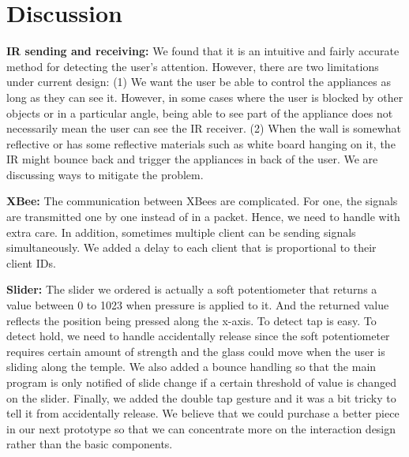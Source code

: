 
\section{Discussion}
\label{sec:discussion}


\textbf{IR sending and receiving:} We found that it is an intuitive and fairly accurate method for detecting the user's attention. However, there are two limitations under current design: (1) We want the user be able to control the appliances as long as they can see it. However, in some cases where the user is blocked by other objects or in a particular angle, being able to see part of the appliance does not necessarily mean the user can see the IR receiver. (2) When the wall is somewhat reflective or has some reflective materials such as white board hanging on it, the IR might bounce back and trigger the appliances in back of the user. We are discussing ways to mitigate the problem.

\textbf{XBee:} The communication between XBees are complicated. For one, the signals are transmitted one by one instead of in a packet. Hence, we need to handle with extra care. In addition, sometimes multiple client can be sending signals simultaneously. We added a delay to each client that is proportional to their client IDs.

\textbf{Slider:} The slider we ordered is actually a soft potentiometer that returns a value between 0 to 1023 when pressure is applied to it. And the returned value reflects the position being pressed along the x-axis. To detect tap is easy. To detect hold, we need to handle accidentally release since the soft potentiometer requires certain amount of strength and the glass could move when the user is sliding along the temple. We also added a bounce handling so that the main program is only notified of slide change if a certain threshold of value is changed on the slider. Finally, we added the double tap gesture and it was a bit tricky to tell it from accidentally release. We believe that we could purchase a better piece in our next prototype so that we can concentrate more on the interaction design rather than the basic components.

